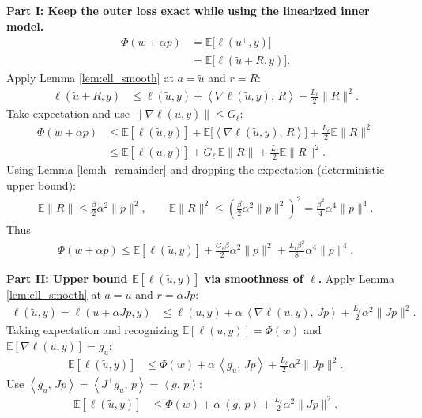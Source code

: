 \documentclass[11pt]{article}
\newcommand{\E}{\mathbb{E}}
\newcommand{\inner}[2]{\left\langle #1,\, #2 \right\rangle}
\begin{document}
\noindent\textbf{Part I: Keep the outer loss exact while using the linearized inner model.}
\begin{align}
\Phi(w+\alpha p) &= \E\big[\ell(u^+,y)\big] \nonumber\\
&= \E\big[\ell(\tilde{u}+R,y)\big]. \nonumber
\end{align}
Apply Lemma \ref{lem:ell_smooth} at $a=\tilde{u}$ and $r=R$:
\begin{align}
\ell(\tilde{u}+R,y) 
&\le \ell(\tilde{u},y) + \inner{\nabla\ell(\tilde{u},y)}{R} + \frac{L_\ell}{2}\|R\|^2. \tag*{[Step 1]}
\end{align}
Take expectation and use $\|\nabla\ell(\tilde{u},y)\|\le G_\ell$:
\begin{align}
\Phi(w+\alpha p)
&\le \E[\ell(\tilde{u},y)] + \E\big[\inner{\nabla\ell(\tilde{u},y)}{R}\big] + \frac{L_\ell}{2}\E\|R\|^2 \nonumber\\
&\le \E[\ell(\tilde{u},y)] + G_\ell\,\E\|R\| + \frac{L_\ell}{2}\E\|R\|^2. \tag*{[Step 2]: Cauchy-Schwarz and gradient bound}
\end{align}
Using Lemma \ref{lem:h_remainder} and dropping the expectation (deterministic upper bound):
\begin{align}
\E\|R\| \le \frac{\beta}{2}\alpha^2\|p\|^2,\qquad
\E\|R\|^2 \le \left(\frac{\beta}{2}\alpha^2\|p\|^2\right)^2 = \frac{\beta^2}{4}\alpha^4\|p\|^4. \tag*{[Step 3]}
\end{align}
Thus
\begin{align}
\Phi(w+\alpha p) \le \E[\ell(\tilde{u},y)] + \frac{G_\ell \beta}{2}\alpha^2\|p\|^2 + \frac{L_\ell \beta^2}{8}\alpha^4\|p\|^4. \tag*{[Step 4]}
\end{align}

\noindent\textbf{Part II: Upper bound $\E[\ell(\tilde{u},y)]$ via smoothness of $\ell$.}
Apply Lemma \ref{lem:ell_smooth} at $a=u$ and $r=\alpha J p$:
\begin{align}
\ell(\tilde{u},y) = \ell(u+\alpha J p,y)
&\le \ell(u,y) + \alpha\,\inner{\nabla\ell(u,y)}{J p} + \frac{L_\ell}{2}\alpha^2 \|J p\|^2. \tag*{[Step 5]}
\end{align}
Taking expectation and recognizing $\E[\ell(u,y)]=\Phi(w)$ and $\E[\nabla\ell(u,y)]=g_u$:
\begin{align}
\E[\ell(\tilde{u},y)] 
&\le \Phi(w) + \alpha\,\inner{g_u}{J p} + \frac{L_\ell}{2}\alpha^2 \|J p\|^2. \tag*{[Step 6]}
\end{align}
Use $\inner{g_u}{J p} = \inner{J^\top g_u}{p} = \inner{g}{p}$:
\begin{align}
\E[\ell(\tilde{u},y)] 
&\le \Phi(w) + \alpha\,\inner{g}{p} + \frac{L_\ell}{2}\alpha^2 \|J p\|^2. \tag*{[Step 7]}
\end{align}
\end{document}
